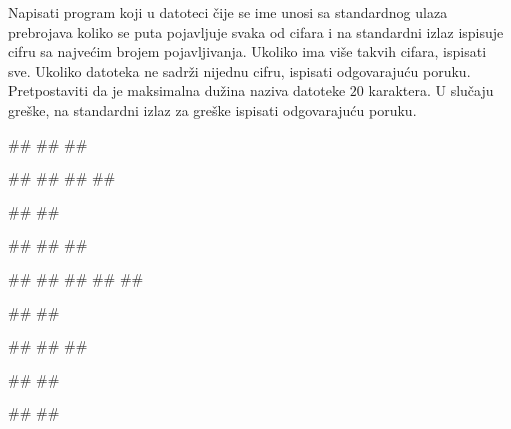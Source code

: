 \begin{Exercise}[label=p3_id14]         
Napisati program koji u datoteci čije se ime unosi sa standardnog ulaza prebrojava
koliko se puta pojavljuje svaka od cifara i na standardni izlaz ispisuje cifru sa najvećim brojem pojavljivanja. 
Ukoliko ima više takvih cifara, ispisati sve. Ukoliko datoteka ne sadrži nijednu cifru, ispisati odgovarajuću
poruku. 
Pretpostaviti da je maksimalna dužina naziva datoteke $20$ karaktera.
U slučaju greške, na standardni izlaz za greške ispisati odgovarajuću poruku.

\begin{minitest}
\begin{upotreba}{1}
#\naslovInt#
##
##

##
##
##
##

#\naslovIzlaz#
##
\end{upotreba}
\end{minitest}
\begin{minitest}
\begin{upotreba}{2}
#\naslovInt#
##
##

##
##
##
##
##

#\naslovIzlaz#
##
\end{upotreba}
\end{minitest}
\begin{minitest}
\begin{upotreba}{3}
#\naslovInt#
##
##

##
##

#\naslovIzlaz#
##
\end{upotreba}
\end{minitest}
\end{Exercise}
\begin{Answer}[ref=p3_id14]
\end{Answer}


